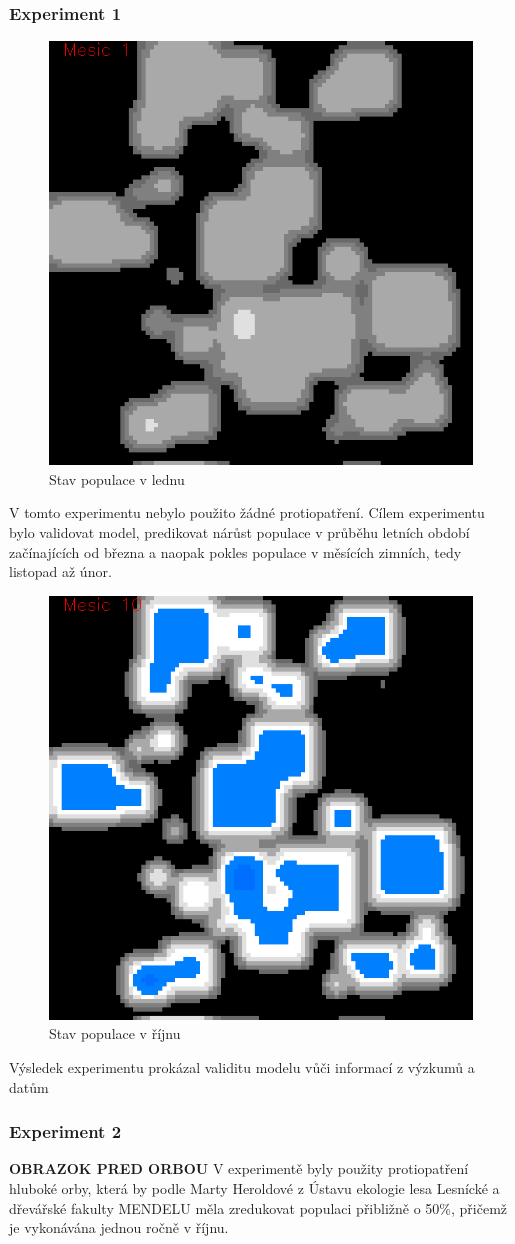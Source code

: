\documentclass[a4paper,11pt]{article}
\begin{document}
\subsubsection{Experiment 1}
\begin{figure}[h]
\begin{center}  
    \includegraphics[width=.4\linewidth]{bez_regul1.png}
    \caption{Stav populace v lednu}
    \label{pic:exp1_obr1}
\end{center}
\end{figure}

V tomto experimentu nebylo použito žádné protiopatření. Cílem experimentu bylo validovat model, predikovat nárůst populace v průběhu letních období začínajících od března a naopak pokles populace v měsících zimních, tedy listopad až únor. 

\begin{figure}[h]
\begin{center}
    \includegraphics[width=.4\linewidth]{bez_regul10.png}
    \caption{Stav populace v říjnu}
    \label{pic:exp1_obr2}
\end{center}
\end{figure}

Výsledek experimentu prokázal validitu modelu vůči informací z výzkumů \cite{fluktuace} a datům \cite{Voles-popul-data:online}
\subsubsection{Experiment 2}
\textbf{OBRAZOK PRED ORBOU}
V experimentě byly použity protiopatření hluboké orby, která by podle Marty Heroldové z Ústavu ekologie lesa Lesnícké a dřevářské fakulty MENDELU měla zredukovat populaci přibližně o 50\%, přičemž je vykonávána jednou ročně v říjnu. 
\end{document}
